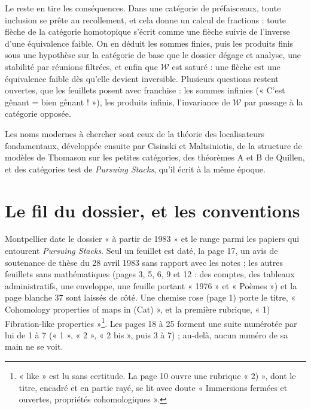 \documentclass[11pt,a4paper]{article}
\begin{document}
\begin{resume}
Le reste en tire les conséquences. Dans une catégorie de préfaisceaux, toute
inclusion se prête au recollement, et cela donne un calcul de fractions : toute
flèche de la catégorie homotopique s'écrit comme une flèche suivie de
l'inverse d'une équivalence faible. On en déduit les sommes finies, puis les
produits finis sous une hypothèse sur la catégorie de base que le dossier
dégage et analyse, une stabilité par réunions filtrées, et enfin que
$\mathcal{W}$ est saturé : une flèche est une équivalence faible dès qu'elle
devient inversible. Plusieurs questions restent ouvertes, que les feuillets
posent avec franchise : les sommes infinies (« C'est gênant = bien
gênant ! »), les produits infinis, l'invariance de $\mathcal{W}$ par passage
à la catégorie opposée.

Les noms modernes à chercher sont ceux de la théorie des localisateurs
fondamentaux, développée ensuite par Cisinski et Maltsiniotis, de la structure
de modèles de Thomason sur les petites catégories, des théorèmes A et B de
Quillen, et des catégories test de \emph{Pursuing Stacks}, qu'il écrit à la
même époque.

\end{resume}

\section*{Le fil du dossier, et les conventions}

Montpellier date le dossier « à partir de 1983 » et le range parmi les papiers
qui entourent \emph{Pursuing Stacks}. Seul un feuillet est daté, la page 17,
un avis de soutenance de thèse du 28 avril 1983 sans rapport avec les notes ;
les autres feuillets sans mathématiques (pages 3, 5, 6, 9 et 12 : des comptes,
des tableaux administratifs, une enveloppe, une feuille portant « 1976 » et
« Poèmes ») et la page blanche 37 sont laissés de côté. Une chemise rose
(page 1) porte le titre, « Cohomology properties of maps in (Cat) », et la
première rubrique, « 1) Fibration-like properties »\footnote{« like » est lu
sans certitude. La page 10 ouvre une rubrique « 2) », dont le titre, encadré
et en partie rayé, se lit avec doute « Immersions fermées et ouvertes,
propriétés cohomologiques ».}. Les pages 18 à 25 forment une suite numérotée
par lui de 1 à 7 (« 1 », « 2 », « 2 bis », puis 3 à 7) ; au-delà, aucun
numéro de sa main ne se voit.
\end{document}
